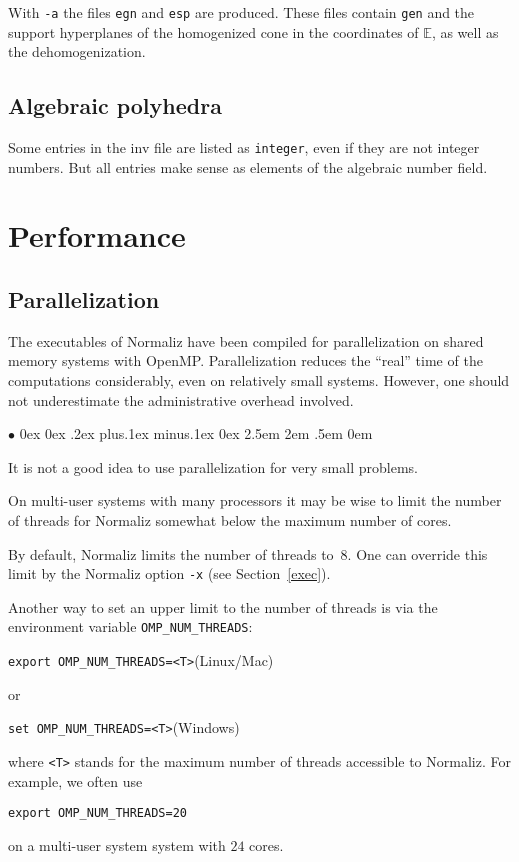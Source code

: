 \documentclass[12pt,a4paper]{scrartcl}
\newcommand{\stdli}{ \topsep0ex \partopsep0ex %
\parsep.2ex plus.1ex minus.1ex \itemsep0ex%
\leftmargin2.5em \labelwidth2em \labelsep.5em \rightmargin0em}%
\renewenvironment{itemize}{\begin{list}{{$\bullet$}}{\stdli}}{\end{list}}
\theoremstyle{definition}
\def\EE{{\mathbb E}}
\def\ttt{\texttt}
\begin{document}
With \verb|-a| the files \verb|egn| and \verb|esp| are produced. These files contain \verb|gen| and the support hyperplanes of the homogenized cone in the coordinates of $\EE$, as well as the dehomogenization.

\subsection{Algebraic polyhedra}

Some entries in the inv file are listed as \ttt{integer}, even if they are not integer numbers. But all entries make sense as elements of the algebraic number field.

\section{Performance}\label{Perf}

\subsection{Parallelization}\label{PerfPar}

The executables of Normaliz have been compiled for parallelization
on shared memory systems with OpenMP. Parallelization reduces the
``real'' time of the computations considerably, even on relatively
small systems. However, one should not underestimate the
administrative overhead involved.
\begin{itemize}
	\item It is not a good idea to use parallelization for very small problems.
	\item On multi-user systems with many processors it may be wise to limit
	the number of threads for Normaliz somewhat below the maximum
	number of cores.
\end{itemize}
By default, Normaliz limits the number of threads to~$8$. One can override this limit by the Normaliz
option \ttt{-x} (see Section~\ref{exec}).

Another way to set an upper limit to the number of threads is via the environment variable \verb|OMP_NUM_THREADS|:
\begin{center}
	\verb+export OMP_NUM_THREADS=<T>+\qquad (Linux/Mac)
\end{center}
or
\begin{center}
	\verb+set OMP_NUM_THREADS=<T>+\qquad (Windows)
\end{center}
where \ttt{<T>} stands for the maximum number of threads
accessible to Normaliz. For example, we often use
\begin{center}
	\verb+export OMP_NUM_THREADS=20+
\end{center}
on a multi-user system system with $24$ cores.
\end{document}

